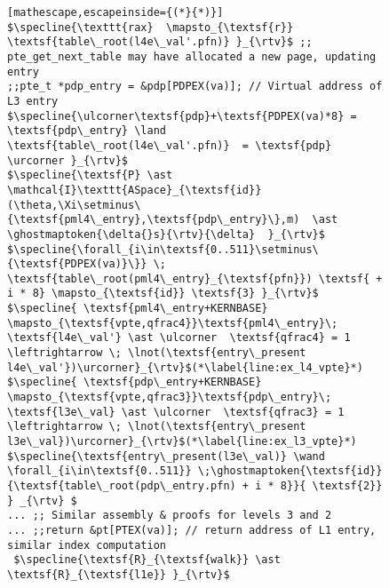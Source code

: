 \begin{figure}
\begin{lstlisting}[mathescape,escapeinside={(*}{*)}]
$\specline{\texttt{rax}  \mapsto_{\textsf{r}} \textsf{table\_root(l4e\_val'.pfn)} }_{\rtv}$ ;; pte_get_next_table may have allocated a new page, updating entry
;;pte_t *pdp_entry = &pdp[PDPEX(va)]; // Virtual address of L3 entry
$\specline{\ulcorner\textsf{pdp}+\textsf{PDPEX(va)*8} = \textsf{pdp\_entry} \land \textsf{table\_root(l4e\_val'.pfn)}  = \textsf{pdp} \urcorner }_{\rtv}$
$\specline{\textsf{P} \ast \mathcal{I}\texttt{ASpace}_{\textsf{id}}(\theta,\Xi\setminus\{\textsf{pml4\_entry},\textsf{pdp\_entry}\},m)  \ast \ghostmaptoken{\delta{}s}{\rtv}{\delta}  }_{\rtv}$
$\specline{\forall_{i\in\textsf{0..511}\setminus\{\textsf{PDPEX(va)}\}} \; \textsf{table\_root(pml4\_entry}_{\textsf{pfn}}) \textsf{ + i * 8} \mapsto_{\textsf{id}} \textsf{3} }_{\rtv}$
$\specline{ \textsf{pml4\_entry+KERNBASE} \mapsto_{\textsf{vpte,qfrac4}}\textsf{pml4\_entry}\; \textsf{l4e\_val'} \ast \ulcorner  \textsf{qfrac4} = 1 \leftrightarrow \; \lnot(\textsf{entry\_present l4e\_val'})\urcorner}_{\rtv}$(*\label{line:ex_l4_vpte}*)
$\specline{ \textsf{pdp\_entry+KERNBASE} \mapsto_{\textsf{vpte,qfrac3}}\textsf{pdp\_entry}\; \textsf{l3e\_val} \ast \ulcorner  \textsf{qfrac3} = 1 \leftrightarrow \; \lnot(\textsf{entry\_present l3e\_val})\urcorner}_{\rtv}$(*\label{line:ex_l3_vpte}*)
$\specline{\textsf{entry\_present(l3e\_val)} \wand \forall_{i\in\textsf{0..511}} \;\ghostmaptoken{\textsf{id}}{\textsf{table\_root(pdp\_entry.pfn) + i * 8}}{ \textsf{2}} } _{\rtv} $
... ;; Similar assembly & proofs for levels 3 and 2
... ;;return &pt[PTEX(va)]; // return address of L1 entry, similar index computation
 $\specline{\textsf{R}_{\textsf{walk}} \ast \textsf{R}_{\textsf{l1e}} }_{\rtv}$
\end{lstlisting}


\end{figure}

